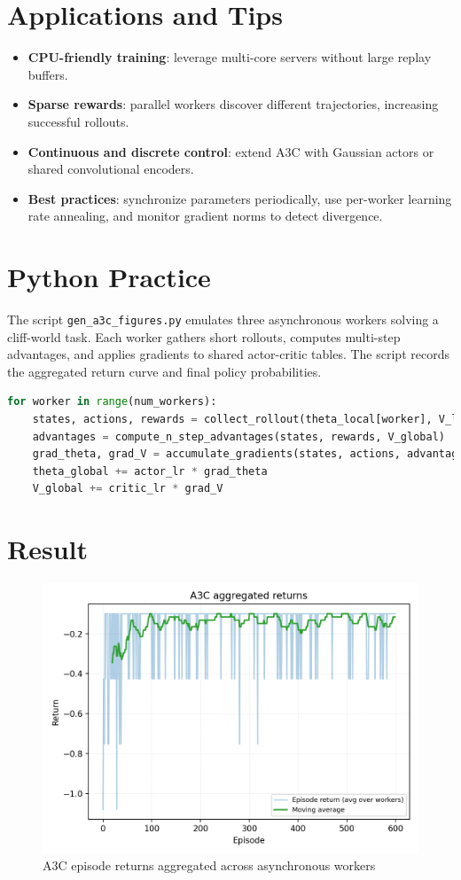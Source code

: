 ﻿\documentclass[12pt]{article}
\begin{document}
\section{Applications and Tips}
\begin{itemize}
  \item \textbf{CPU-friendly training}: leverage multi-core servers without large replay buffers.
  \item \textbf{Sparse rewards}: parallel workers discover different trajectories, increasing successful rollouts.
  \item \textbf{Continuous and discrete control}: extend A3C with Gaussian actors or shared convolutional encoders.
  \item \textbf{Best practices}: synchronize parameters periodically, use per-worker learning rate annealing, and monitor gradient norms to detect divergence.
\end{itemize}

\section{Python Practice}
The script \texttt{gen\_a3c\_figures.py} emulates three asynchronous workers solving a cliff-world task. Each worker gathers short rollouts, computes multi-step advantages, and applies gradients to shared actor-critic tables. The script records the aggregated return curve and final policy probabilities.
\begin{lstlisting}[language=Python,caption={Excerpt from gen_a3c_figures.py}]
for worker in range(num_workers):
    states, actions, rewards = collect_rollout(theta_local[worker], V_local[worker])
    advantages = compute_n_step_advantages(states, rewards, V_global)
    grad_theta, grad_V = accumulate_gradients(states, actions, advantages)
    theta_global += actor_lr * grad_theta
    V_global += critic_lr * grad_V
\end{lstlisting}

\section{Result}
\begin{figure}[H]
  \centering
  \includegraphics[width=0.8\linewidth]{a3c_returns.png}
  \caption{A3C episode returns aggregated across asynchronous workers}
  \label{fig:a3c_returns}
\end{figure}
\end{document}
